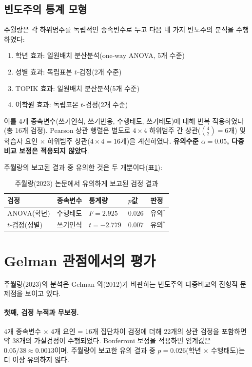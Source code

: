 \documentclass[11pt]{article}
\begin{document}
\subsection{빈도주의 통계 모형}
주월랑은 각 하위범주를 독립적인 종속변수로 두고 다음 네 가지 빈도주의 분석을 수행하였다:
\begin{enumerate}
\item 학년 효과: 일원배치 분산분석(one-way ANOVA, 5개 수준)
\item 성별 효과: 독립표본 $t$-검정(2개 수준)
\item TOPIK 효과: 일원배치 분산분석(5개 수준)
\item 어학원 효과: 독립표본 $t$-검정(2개 수준)
\end{enumerate}
이를 4개 종속변수(쓰기인식, 쓰기반응, 수행태도, 쓰기태도)에 대해 반복 적용하였다(총 16개 검정). Pearson 상관 행렬은 별도로 $4\times 4$ 하위범주 간 상관($\binom{4}{2}=6$개) 및 학습자 요인 $\times$ 하위범주 상관($4\times 4=16$개)을 계산하였다. \textbf{유의수준 $\alpha=0.05$, 다중비교 보정은 적용되지 않았다}.

주월랑의 보고된 결과 중 유의한 것은 두 개뿐이다(표\ref{tab:paper_sig}):
\begin{table}[h]
\centering
\caption{주월랑(2023) 논문에서 유의하게 보고된 검정 결과}\label{tab:paper_sig}
\begin{tabular}{lllll}
\toprule
검정 & 종속변수 & 통계량 & $p$값 & 판정 \\
\midrule
ANOVA(학년) & 수행태도 & $F=2.925$ & $0.026$ & 유의$^*$ \\
$t$-검정(성별) & 쓰기인식 & $t=-2.779$ & $0.007$ & 유의$^*$ \\
\bottomrule
\end{tabular}
\end{table}

\section{Gelman 관점에서의 평가}

주월랑(2023)의 분석은 Gelman 외(2012)가 비판하는 빈도주의 다중비교의 전형적 문제점을 보이고 있다.

\paragraph{첫째, 검정 누적과 무보정.}
4개 종속변수 $\times$ 4개 요인 = 16개 집단차이 검정에 더해 22개의 상관 검정을 포함하면 약 38개의 가설검정이 수행되었다. Bonferroni 보정을 적용하면 임계값은 $0.05/38 \approx 0.0013$이며, 주월랑이 보고한 유의 결과 중 $p=0.026$(학년 $\times$ 수행태도)는 더 이상 유의하지 않다.
\end{document}
